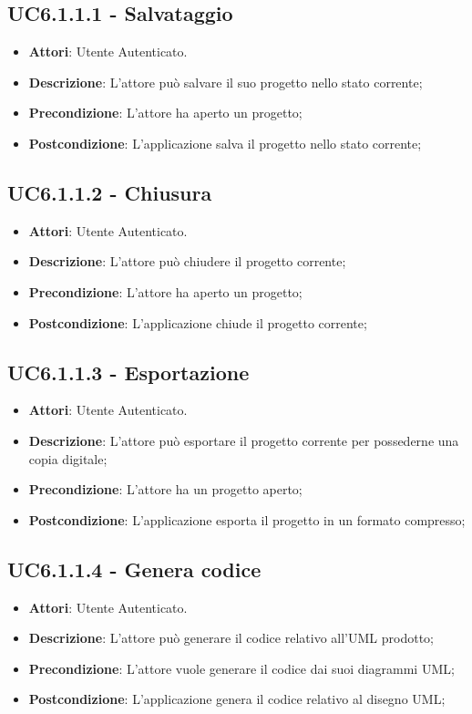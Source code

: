 \subsection{UC6.1.1.1 - Salvataggio} 
\label{ssec:UC6.1.1.1} 
\begin{itemize} 
\item \textbf{Attori}: Utente Autenticato.
\item \textbf{Descrizione}: L’attore può salvare il suo progetto nello stato corrente;
\item \textbf{Precondizione}: L’attore ha aperto un progetto;
\item \textbf{Postcondizione}: L’applicazione salva il progetto nello stato corrente;
\end{itemize} 
\subsection{UC6.1.1.2 - Chiusura} 
\label{ssec:UC6.1.1.2} 
\begin{itemize} 
\item \textbf{Attori}: Utente Autenticato.
\item \textbf{Descrizione}: L’attore può chiudere il progetto corrente;
\item \textbf{Precondizione}: L'attore ha aperto un progetto;
\item \textbf{Postcondizione}: L’applicazione chiude il progetto corrente;
\end{itemize} 
\subsection{UC6.1.1.3 - Esportazione} 
\label{ssec:UC6.1.1.3} 
\begin{itemize} 
\item \textbf{Attori}: Utente Autenticato.
\item \textbf{Descrizione}: L’attore può esportare il progetto corrente per possederne una copia digitale;
\item \textbf{Precondizione}: L’attore ha un progetto aperto;
\item \textbf{Postcondizione}: L’applicazione esporta il progetto in un formato compresso;
\end{itemize} 
\subsection{UC6.1.1.4 - Genera codice} 
\label{ssec:UC6.1.1.4} 
\begin{itemize} 
\item \textbf{Attori}: Utente Autenticato.
\item \textbf{Descrizione}: L’attore può generare il codice relativo all’UML prodotto;
\item \textbf{Precondizione}: L’attore vuole generare il codice dai suoi diagrammi UML;
\item \textbf{Postcondizione}: L’applicazione genera il codice relativo al disegno UML;
\end{itemize} 
